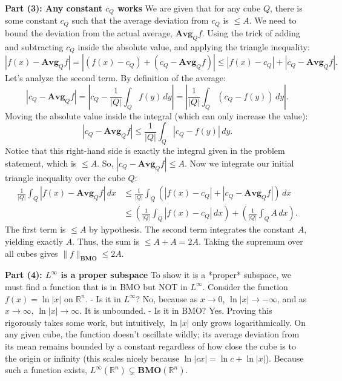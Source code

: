 \begin{solution}
\textbf{Part (3): Any constant $c_Q$ works}
We are given that for any cube $Q$, there is some constant $c_Q$ such that the average deviation from $c_Q$ is $\leq A$.
We need to bound the deviation from the actual average, $\mathbf{Avg}_Q f$.
Using the trick of adding and subtracting $c_Q$ inside the absolute value, and applying the triangle inequality:
\[
|f(x) - \mathbf{Avg}_Q f| = |(f(x) - c_Q) + (c_Q - \mathbf{Avg}_Q f)| \leq |f(x) - c_Q| + |c_Q - \mathbf{Avg}_Q f|.
\]
Let's analyze the second term. By definition of the average:
\[
|c_Q - \mathbf{Avg}_Q f| = \left| c_Q - \frac{1}{|Q|} \int_Q f(y) \,dy \right| = \left| \frac{1}{|Q|} \int_Q (c_Q - f(y)) \,dy \right|.
\]
Moving the absolute value inside the integral (which can only increase the value):
\[
|c_Q - \mathbf{Avg}_Q f| \leq \frac{1}{|Q|} \int_Q |c_Q - f(y)| \,dy.
\]
Notice that this right-hand side is exactly the integral given in the problem statement, which is $\leq A$.
So, $|c_Q - \mathbf{Avg}_Q f| \leq A$.
Now we integrate our initial triangle inequality over the cube $Q$:
\begin{align*}
\frac{1}{|Q|} \int_Q |f(x) - \mathbf{Avg}_Q f| \,dx &\leq \frac{1}{|Q|} \int_Q \left( |f(x) - c_Q| + |c_Q - \mathbf{Avg}_Q f| \right) \,dx \\
&\leq \left( \frac{1}{|Q|} \int_Q |f(x) - c_Q| \,dx \right) + \left( \frac{1}{|Q|} \int_Q A \,dx \right).
\end{align*}
The first term is $\leq A$ by hypothesis. The second term integrates the constant $A$, yielding exactly $A$.
Thus, the sum is $\leq A + A = 2A$.
Taking the supremum over all cubes gives $\|f\|_{\mathbf{BMO}} \leq 2A$.

\textbf{Part (4): $L^\infty$ is a proper subspace}
To show it is a *proper* subspace, we must find a function that is in BMO but NOT in $L^\infty$.
Consider the function $f(x) = \ln |x|$ on $\mathbb{R}^n$.
- Is it in $L^\infty$? No, because as $x \to 0$, $\ln |x| \to -\infty$, and as $x \to \infty$, $\ln |x| \to \infty$. It is unbounded.
- Is it in BMO? Yes. Proving this rigorously takes some work, but intuitively, $\ln |x|$ only grows logarithmically. On any given cube, the function doesn't oscillate wildly; its average deviation from its mean remains bounded by a constant regardless of how close the cube is to the origin or infinity (this scales nicely because $\ln |cx| = \ln c + \ln |x|$).
Because such a function exists, $L^\infty(\mathbb{R}^n) \subsetneq \mathbf{BMO}(\mathbb{R}^n)$.
\end{solution}
